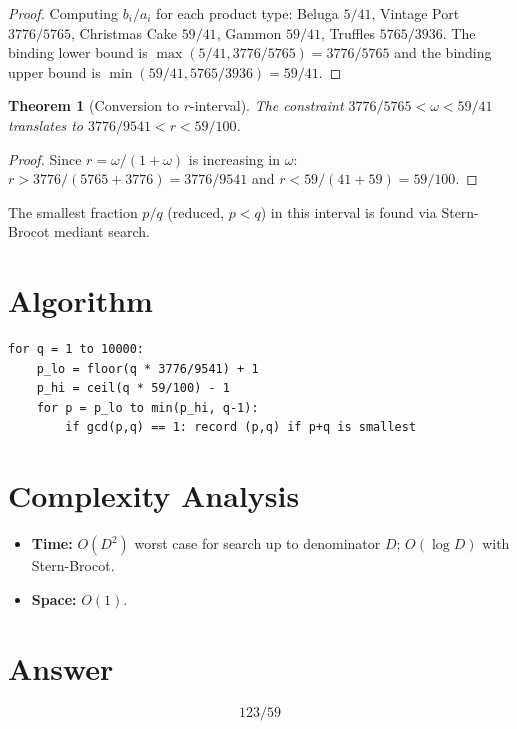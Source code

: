 \documentclass[12pt]{article}
\newtheorem{theorem}{Theorem}
\begin{document}
\begin{proof}
Computing $b_i/a_i$ for each product type: Beluga $5/41$, Vintage Port $3776/5765$, Christmas Cake $59/41$, Gammon $59/41$, Truffles $5765/3936$. The binding lower bound is $\max(5/41, 3776/5765) = 3776/5765$ and the binding upper bound is $\min(59/41, 5765/3936) = 59/41$.
\end{proof}

\begin{theorem}[Conversion to $r$-interval]
The constraint $3776/5765 < \omega < 59/41$ translates to $3776/9541 < r < 59/100$.
\end{theorem}

\begin{proof}
Since $r = \omega/(1+\omega)$ is increasing in $\omega$: $r > 3776/(5765+3776) = 3776/9541$ and $r < 59/(41+59) = 59/100$.
\end{proof}

The smallest fraction $p/q$ (reduced, $p < q$) in this interval is found via Stern-Brocot mediant search.

\section{Algorithm}

\begin{verbatim}
for q = 1 to 10000:
    p_lo = floor(q * 3776/9541) + 1
    p_hi = ceil(q * 59/100) - 1
    for p = p_lo to min(p_hi, q-1):
        if gcd(p,q) == 1: record (p,q) if p+q is smallest
\end{verbatim}

\section{Complexity Analysis}
\begin{itemize}
    \item \textbf{Time:} $O(D^2)$ worst case for search up to denominator $D$; $O(\log D)$ with Stern-Brocot.
    \item \textbf{Space:} $O(1)$.
\end{itemize}

\section{Answer}

\[
\boxed{123/59}
\]
\end{document}
